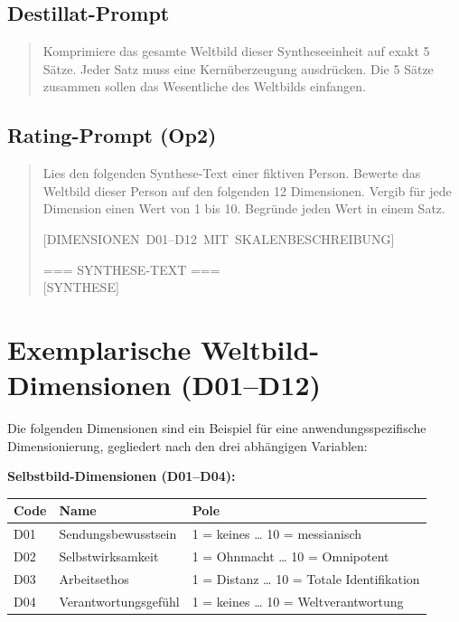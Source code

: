 \documentclass[11pt,a4paper]{article}
\theoremstyle{definition}
\theoremstyle{plain}
\theoremstyle{remark}
\begin{document}
\subsection{Destillat-Prompt}

\begin{quote}
\small\ttfamily
Komprimiere das gesamte Weltbild dieser Syntheseeinheit auf exakt 5 S\"atze. Jeder Satz muss eine Kern\"uberzeugung ausdr\"ucken. Die 5 S\"atze zusammen sollen das Wesentliche des Weltbilds einfangen.
\end{quote}

\subsection{Rating-Prompt (Op2)}

\begin{quote}
\small\ttfamily
Lies den folgenden Synthese-Text einer fiktiven Person. Bewerte das Weltbild dieser Person auf den folgenden 12 Dimensionen. Vergib f\"ur jede Dimension einen Wert von 1 bis 10. Begr\"unde jeden Wert in einem Satz.

\mbox{[DIMENSIONEN D01--D12 MIT SKALENBESCHREIBUNG]}

=== SYNTHESE-TEXT ===\\
\mbox{[SYNTHESE]}
\end{quote}


\section{Exemplarische Weltbild-Dimensionen (D01--D12)}
\label{app:dimensionen}

Die folgenden Dimensionen sind ein Beispiel f\"ur eine anwendungsspezifische Dimensionierung, gegliedert nach den drei abh\"angigen Variablen:

\bigskip
\noindent\textbf{Selbstbild-Dimensionen (D01--D04):}

\begin{tabularx}{\textwidth}{l l X}
  \toprule
  \textbf{Code} & \textbf{Name} & \textbf{Pole} \\
  \midrule
  D01 & Sendungsbewusstsein & 1 = keines \ldots{} 10 = messianisch \\
  D02 & Selbstwirksamkeit & 1 = Ohnmacht \ldots{} 10 = Omnipotent \\
  D03 & Arbeitsethos & 1 = Distanz \ldots{} 10 = Totale Identifikation \\
  D04 & Verantwortungsgef\"uhl & 1 = keines \ldots{} 10 = Weltverantwortung \\
  \bottomrule
\end{tabularx}
\end{document}
